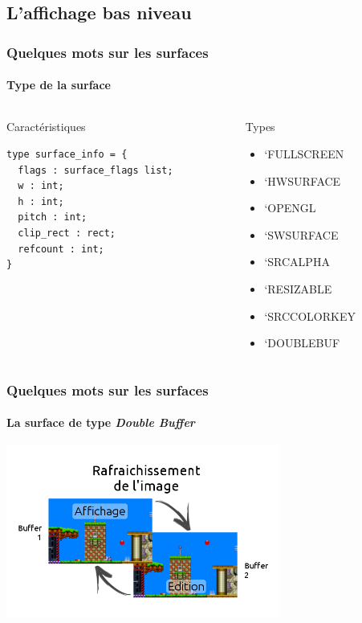 \subsection{L'affichage bas niveau} %
\begin{frame}[fragile]
	\frametitle{Quelques mots sur les surfaces}
	\framesubtitle{Type de la surface}
	\begin{columns}
		\begin{column}{5.2cm}
			\begin{block}{Caractéristiques}
				\lstset{basicstyle=\small}
				\begin{lstlisting}
type surface_info = {
  flags : surface_flags list;
  w : int;
  h : int;
  pitch : int;
  clip_rect : rect;
  refcount : int;
}
				\end{lstlisting}
			\end{block}
		\end{column}
		\begin{column}{3.6cm}
			\begin{block}{Types}
				\begin{itemize}
					\item `FULLSCREEN
					\item `HWSURFACE
					\item `OPENGL
					\item `SWSURFACE
					\item `SRCALPHA
					\item `RESIZABLE
					\item `SRCCOLORKEY
					\item `DOUBLEBUF
				\end{itemize}
			\end{block}
		\end{column}
	\end{columns}
\end{frame}


\begin{frame}
	\frametitle{Quelques mots sur les surfaces}
	\framesubtitle{La surface de type \textit{Double Buffer}}
	\begin{center}
		\includegraphics[width=9cm]{pics/doubleBuffer.png}
	\end{center}
\end{frame}

